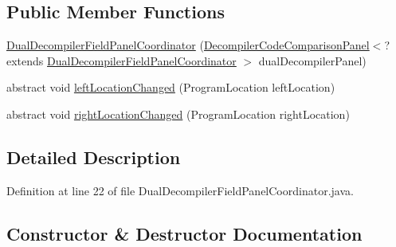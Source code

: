 \subsection*{Public Member Functions}
\begin{DoxyCompactItemize}
\item 
\mbox{\hyperlink{classghidra_1_1app_1_1decompiler_1_1component_1_1_dual_decompiler_field_panel_coordinator_a37bc7004003f2f9661dc19a7412149e7}{Dual\+Decompiler\+Field\+Panel\+Coordinator}} (\mbox{\hyperlink{classghidra_1_1app_1_1decompiler_1_1component_1_1_decompiler_code_comparison_panel}{Decompiler\+Code\+Comparison\+Panel}}$<$? extends \mbox{\hyperlink{classghidra_1_1app_1_1decompiler_1_1component_1_1_dual_decompiler_field_panel_coordinator}{Dual\+Decompiler\+Field\+Panel\+Coordinator}} $>$ dual\+Decompiler\+Panel)
\item 
abstract void \mbox{\hyperlink{classghidra_1_1app_1_1decompiler_1_1component_1_1_dual_decompiler_field_panel_coordinator_a9bab738b2c867a3a99540a68d9737c4a}{left\+Location\+Changed}} (Program\+Location left\+Location)
\item 
abstract void \mbox{\hyperlink{classghidra_1_1app_1_1decompiler_1_1component_1_1_dual_decompiler_field_panel_coordinator_aa1d01c29c03580ba477976b8d1ff4593}{right\+Location\+Changed}} (Program\+Location right\+Location)
\end{DoxyCompactItemize}


\subsection{Detailed Description}


Definition at line 22 of file Dual\+Decompiler\+Field\+Panel\+Coordinator.\+java.



\subsection{Constructor \& Destructor Documentation}
\mbox{\label{classghidra_1_1app_1_1decompiler_1_1component_1_1_dual_decompiler_field_panel_coordinator_a37bc7004003f2f9661dc19a7412149e7}} 
